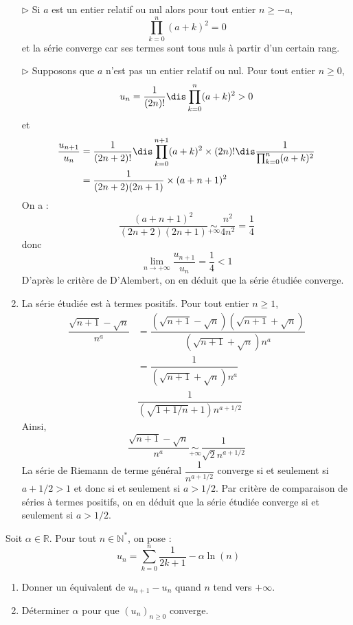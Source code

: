\documentclass[a4paper,10pt]{report}
\begin{document}
\begin{enumerate}
\medskip

\noindent $\rhd$ Si $a$ est un entier relatif ou nul alors pour tout entier $n \geq -a$,
$$ \prod_{k=0}^n (a+k)^2 = 0$$
et la série converge car ses termes sont tous nuls à partir d'un certain rang.

\medskip

\noindent $\rhd$ Supposons que $a$ n'est pas un entier relatif ou nul. Pour tout entier $n \geq 0$,
$$ u_n = \dfrac{1}{(2n)!} \dis \prod_{k=0}^n (a+k)^2 >0$$
et 
\begin{align*}
\dfrac{u_{n+1}}{u_n} & = \dfrac{1}{(2n+2)!} \dis \prod_{k=0}^{n+1} (a+k)^2 \times (2n)! \dis \dfrac{1}{\prod_{k=0}^n (a+k)^2} \\
& = \dfrac{1}{(2n+2)(2n+1)} \times (a+n+1)^2 
\end{align*}
On a :
$$ \dfrac{(a+n+1)^2}{(2n+2)(2n+1)} \underset{+ \infty}{\sim} \dfrac{n^2}{4n^2} = \dfrac{1}{4}$$
donc 
$$ \lim_{n \rightarrow + \infty} \dfrac{u_{n+1}}{u_n} = \dfrac{1}{4} <1$$
D'après le critère de D'Alembert, on en déduit que la série étudiée converge.
\item La série étudiée est à termes positifs. Pour tout entier $n \geq 1$,
\begin{align*}
 \dfrac{\sqrt{n+1}-\sqrt{n}}{n^a} & =  \dfrac{(\sqrt{n+1}-\sqrt{n})(\sqrt{n+1}+ \sqrt{n})}{(\sqrt{n+1}+ \sqrt{n}) n^a} \\
 & = \dfrac{1}{(\sqrt{n+1}+ \sqrt{n}) n^a} \\
 & \dfrac{1}{(\sqrt{1+1/n}+ 1) n^{a+1/2}} 
\end{align*}
Ainsi,
$$  \dfrac{\sqrt{n+1}-\sqrt{n}}{n^a} \underset{+ \infty}{\sim} \dfrac{1}{ \sqrt{2} n^{a+1/2}} $$
La série de Riemann de terme général $\dfrac{1}{n^{a+1/2}}$ converge si et seulement si $a+1/2>1$ et donc si et seulement si $a>1/2$. Par critère de comparaison de séries à termes positifs, on en déduit que la série étudiée converge si et seulement si $a> 1/2$.
\end{enumerate}


\begin{Exa} Soit $\alpha \in \mathbb{R}$. Pour tout $n \in \mathbb{N}^*$, on pose :
$$ u_n = \sum_{k=0}^n \frac{1}{2k+1} -  \alpha \ln(n)$$

\begin{enumerate}
\item Donner un équivalent de $u_{n+1}-u_n$ quand $n$ tend vers $+ \infty$.
\item Déterminer $\alpha$ pour que $(u_n)_{n \geq 0}$ converge.
\end{enumerate}
\end{Exa} 
\end{document}
